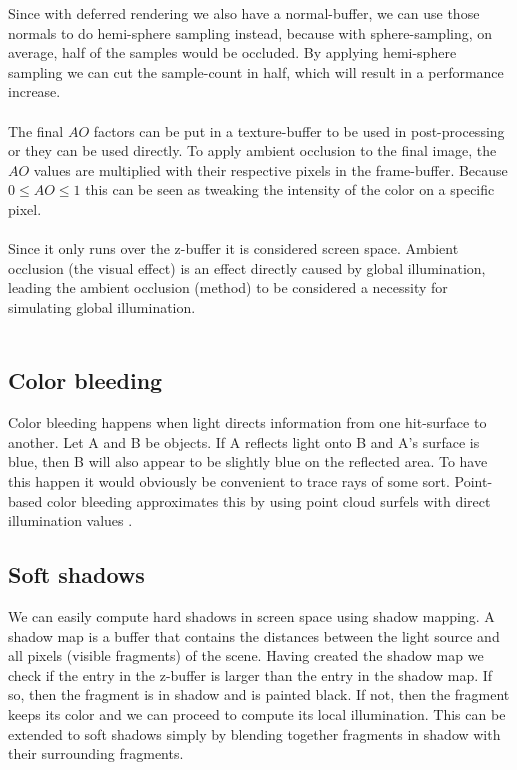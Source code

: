 \documentclass{ACGSeminar}
\begin{document}
		Since with deferred rendering we also have a normal-buffer, we can use those normals to do hemi-sphere sampling instead, because with sphere-sampling, on average, half of the samples would be occluded. By applying hemi-sphere sampling we can cut the sample-count in half, which will result in a performance increase. \\\\
		The final $AO$ factors can be put in a texture-buffer to be used in post-processing or they can be used directly. To apply ambient occlusion to the final image, the $AO$ values are multiplied with their respective pixels in the frame-buffer. Because $0 \leq AO \leq 1$ this can be seen as tweaking the intensity of the color on a specific pixel. \\\\
		Since it only runs over the z-buffer it is considered screen space. Ambient occlusion (the visual effect) is an effect directly caused by global illumination, leading the ambient occlusion (method) to be considered a necessity for simulating global illumination. \\\\

	\subsection{Color bleeding}
		Color bleeding happens when light directs information from one hit-surface to another. Let A and B be objects. If A reflects light onto B and A's surface is blue, then B will also appear
		to be slightly blue on the reflected area. To have this happen it would obviously be convenient to trace rays of some sort. Point-based color bleeding approximates this by using point cloud surfels with direct illumination values \cite{PBCB}.

	\subsection{Soft shadows}
		We can easily compute hard shadows in screen space using shadow mapping. A shadow map is a buffer that contains the distances between the light source and all pixels (visible fragments) of the scene. Having created the shadow map we check if the entry in the z-buffer is larger than the entry in the shadow map. If so, then the fragment is in shadow and is painted black. If not, then the fragment keeps its color and we can proceed to compute its local illumination. This can be extended to soft shadows simply by blending together fragments in shadow with their surrounding fragments.
\end{document}
